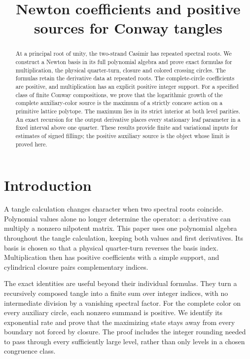 \documentclass[11pt]{article}
\title{Newton coefficients and positive sources for Conway tangles}
\author{}\date{}
\numberwithin{equation}{section}
\theoremstyle{definition}\newtheorem{definition}[theorem]{Definition}
\theoremstyle{remark}\newtheorem{remark}[theorem]{Remark}
\begin{document}
\maketitle
\begin{abstract}
At a principal root of unity, the two-strand Casimir has repeated
spectral roots. We construct a Newton basis in its full polynomial
algebra and prove exact formulas for multiplication, the physical
quarter-turn, closure and colored crossing circles. The formulas retain
the derivative data at repeated roots. The complete-circle coefficients
are positive, and multiplication has an explicit positive integer
support. For a specified class of finite Conway compositions, we prove
that the logarithmic growth of the complete auxiliary-color source is
the maximum of a strictly concave action on a primitive lattice
polytope. The maximum lies in its strict interior at both level
parities. An exact recursion for the output derivative places every
stationary leaf parameter in a fixed interval above one quarter.
These results provide finite and variational inputs for estimates of
signed fillings; the positive auxiliary source is the object whose
limit is proved here.
\end{abstract}

\section{Introduction}
A tangle calculation changes character when two spectral roots
coincide. Polynomial values alone no longer determine the operator:
a derivative can multiply a nonzero nilpotent matrix. This paper uses
one polynomial algebra throughout the tangle calculation, keeping both
values and first derivatives. Its basis is chosen so that a physical
quarter-turn reverses the basis index. Multiplication then has positive
coefficients with a simple support, and cylindrical closure pairs
complementary indices.

The exact identities are useful beyond their individual formulas.
They turn a recursively composed tangle into a finite sum over integer
indices, with no intermediate division by a vanishing spectral
factor. For the complete color on every auxiliary circle, each
nonzero summand is positive. We identify its exponential rate and prove
that the maximizing state stays away from every boundary not forced
by closure. The proof includes the integer rounding needed to pass
through every sufficiently large level, rather than only levels in a
chosen congruence class.
\end{document}
